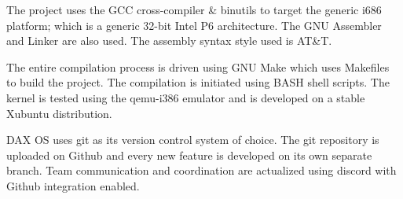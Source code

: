 The project uses the GCC cross-compiler \& binutils to target the generic i686 platform; which is a generic 32-bit Intel P6 architecture. The GNU Assembler and Linker are also used. The assembly syntax style used is AT\&T.

The entire compilation process is driven using GNU Make which uses Makefiles to build the project. The compilation is initiated using BASH shell scripts. The kernel is tested using the qemu-i386 emulator and is developed on a stable Xubuntu distribution. 

DAX OS uses git as its version control system of choice. The git repository is uploaded on Github and every new feature is developed on its own separate branch. Team communication and coordination are actualized using discord with Github integration enabled.


